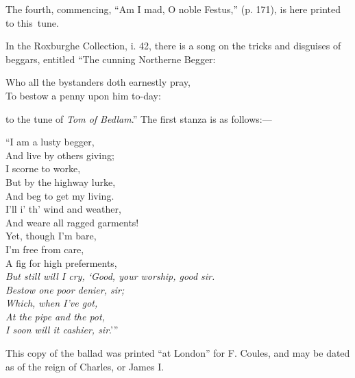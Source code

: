 The fourth, commencing, “Am I mad, O noble Festus,” (p. 171), is here
printed to this~tune.

In the Roxburghe Collection, i. 42, there is a song on the tricks and disguises
of beggars, entitled “The cunning Northerne Begger:
\settowidth{\versewidth}{Who all the bystanders doth earnestly pray,}
\begin{scverse}Who all the bystanders doth earnestly pray,\\
To bestow a penny upon him to-day:
\end{scverse}
to the tune of \textit{Tom of Bedlam}.” The first stanza is as follows:—
\settowidth{\versewidth}{And weare all ragged garments!xxxxxx}
\begin{dcverse}
\begin{patverse}
“I am a lusty begger,\\
And live by others giving;\\
I scorne to worke,\\
But by the highway lurke,\\
And beg to get my living.\\
I’ll i’ th’ wind and weather,\\
And weare all ragged garments!\\
\columnbreak
Yet, though I’m bare,\\
I’m free from care,\\
A fig for high preferments, \\
\textit{But still will I cry, ‘Good, your worship, good sir.\\
Bestow one poor denier, sir;\\
Which, when I’ve got,\\
At the pipe and the pot,\\
I soon will it cashier, sir}.’”
\end{patverse}
\end{dcverse}

This copy of the ballad was printed “at London” for F. Coules, and may be
dated as of the reign of Charles, or James I.

